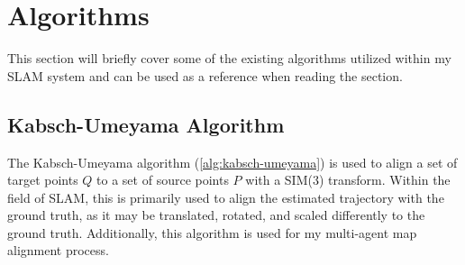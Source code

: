 







\section{Algorithms}
\label{sec:algorithms}
This section will briefly cover some of the existing algorithms utilized within my SLAM system and can be used as a reference when reading the  section.

\subsection{Kabsch-Umeyama Algorithm}
\label{sec:kabsch-umeyama-algorithm}
The Kabsch-Umeyama algorithm (\autoref{alg:kabsch-umeyama}) is used to align a set of target points $Q$ to a set of source points $P$ with a SIM(3) transform. Within the field of SLAM, this is primarily used to align the estimated trajectory with the ground truth, as it may be translated, rotated, and scaled differently to the ground truth. Additionally, this algorithm is used for my multi-agent map alignment process.

